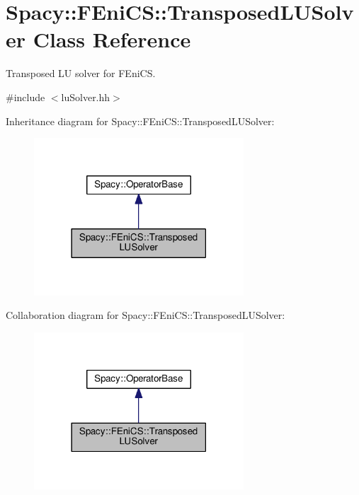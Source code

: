 \hypertarget{classSpacy_1_1FEniCS_1_1TransposedLUSolver}{}\section{Spacy\+:\+:F\+Eni\+C\+S\+:\+:Transposed\+L\+U\+Solver Class Reference}
\label{classSpacy_1_1FEniCS_1_1TransposedLUSolver}


Transposed L\+U solver for F\+Eni\+C\+S.  




{\ttfamily \#include $<$lu\+Solver.\+hh$>$}



Inheritance diagram for Spacy\+:\+:F\+Eni\+C\+S\+:\+:Transposed\+L\+U\+Solver\+:\nopagebreak
\begin{figure}[H]
\begin{center}
\leavevmode
\includegraphics[width=222pt]{classSpacy_1_1FEniCS_1_1TransposedLUSolver__inherit__graph}
\end{center}
\end{figure}


Collaboration diagram for Spacy\+:\+:F\+Eni\+C\+S\+:\+:Transposed\+L\+U\+Solver\+:\nopagebreak
\begin{figure}[H]
\begin{center}
\leavevmode
\includegraphics[width=222pt]{classSpacy_1_1FEniCS_1_1TransposedLUSolver__coll__graph}
\end{center}
\end{figure}

